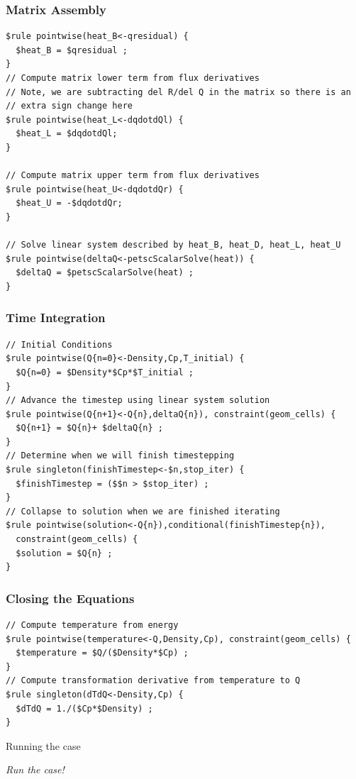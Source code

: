 \documentclass{beamer}
\begin{document}
\begin{frame}[fragile=singleslide]\frametitle{Matrix Assembly}
\scriptsize
\begin{verbatim}
$rule pointwise(heat_B<-qresidual) {
  $heat_B = $qresidual ;
}
// Compute matrix lower term from flux derivatives
// Note, we are subtracting del R/del Q in the matrix so there is an
// extra sign change here
$rule pointwise(heat_L<-dqdotdQl) {
  $heat_L = $dqdotdQl; 
}

// Compute matrix upper term from flux derivatives
$rule pointwise(heat_U<-dqdotdQr) {
  $heat_U = -$dqdotdQr;
}

// Solve linear system described by heat_B, heat_D, heat_L, heat_U
$rule pointwise(deltaQ<-petscScalarSolve(heat)) {
  $deltaQ = $petscScalarSolve(heat) ;
}
\end{verbatim}
\end{frame}

\begin{frame}[fragile=singleslide]\frametitle{Time Integration}
\scriptsize
\begin{verbatim}
// Initial Conditions
$rule pointwise(Q{n=0}<-Density,Cp,T_initial) {
  $Q{n=0} = $Density*$Cp*$T_initial ;
}
// Advance the timestep using linear system solution
$rule pointwise(Q{n+1}<-Q{n},deltaQ{n}), constraint(geom_cells) {
  $Q{n+1} = $Q{n}+ $deltaQ{n} ;
}
// Determine when we will finish timestepping
$rule singleton(finishTimestep<-$n,stop_iter) {
  $finishTimestep = ($$n > $stop_iter) ;
}
// Collapse to solution when we are finished iterating
$rule pointwise(solution<-Q{n}),conditional(finishTimestep{n}),
  constraint(geom_cells) {
  $solution = $Q{n} ;
}
\end{verbatim}
\end{frame}
\begin{frame}[fragile=singleslide]\frametitle{Closing the Equations}
\scriptsize
\begin{verbatim}
// Compute temperature from energy
$rule pointwise(temperature<-Q,Density,Cp), constraint(geom_cells) {
  $temperature = $Q/($Density*$Cp) ;
}
// Compute transformation derivative from temperature to Q
$rule singleton(dTdQ<-Density,Cp) {
  $dTdQ = 1./($Cp*$Density) ;
}
\end{verbatim}
\end{frame}
\begin{frame}{Running the case}

{\it Run the case!}
\end{frame}
\end{document}

